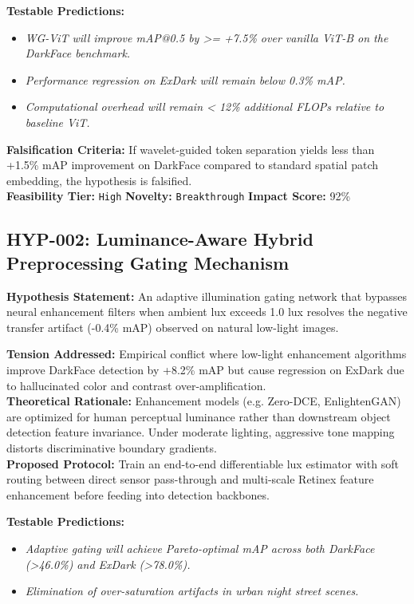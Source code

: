 \documentclass[11pt,a4paper]{article}
\begin{document}
\noindent\textbf{Testable Predictions:}
\begin{itemize}
    \item \textit{WG-ViT will improve mAP@0.5 by >= +7.5\% over vanilla ViT-B on the DarkFace benchmark.}
    \item \textit{Performance regression on ExDark will remain below 0.3\% mAP.}
    \item \textit{Computational overhead will remain < 12\% additional FLOPs relative to baseline ViT.}
\end{itemize}

\noindent\textbf{Falsification Criteria:} If wavelet-guided token separation yields less than +1.5\% mAP improvement on DarkFace compared to standard spatial patch embedding, the hypothesis is falsified. \\
\noindent\textbf{Feasibility Tier:} \texttt{High} \quad \textbf{Novelty:} \texttt{Breakthrough} \quad \textbf{Impact Score:} 92\%

\subsection*{HYP-002: Luminance-Aware Hybrid Preprocessing Gating Mechanism}
\noindent\textbf{Hypothesis Statement:} An adaptive illumination gating network that bypasses neural enhancement filters when ambient lux exceeds 1.0 lux resolves the negative transfer artifact (-0.4\% mAP) observed on natural low-light images.

\noindent\textbf{Tension Addressed:} Empirical conflict where low-light enhancement algorithms improve DarkFace detection by +8.2\% mAP but cause regression on ExDark due to hallucinated color and contrast over-amplification. \\
\noindent\textbf{Theoretical Rationale:} Enhancement models (e.g. Zero-DCE, EnlightenGAN) are optimized for human perceptual luminance rather than downstream object detection feature invariance. Under moderate lighting, aggressive tone mapping distorts discriminative boundary gradients. \\
\noindent\textbf{Proposed Protocol:} Train an end-to-end differentiable lux estimator with soft routing between direct sensor pass-through and multi-scale Retinex feature enhancement before feeding into detection backbones.

\noindent\textbf{Testable Predictions:}
\begin{itemize}
    \item \textit{Adaptive gating will achieve Pareto-optimal mAP across both DarkFace (>46.0\%) and ExDark (>78.0\%).}
    \item \textit{Elimination of over-saturation artifacts in urban night street scenes.}
\end{itemize}
\end{document}
